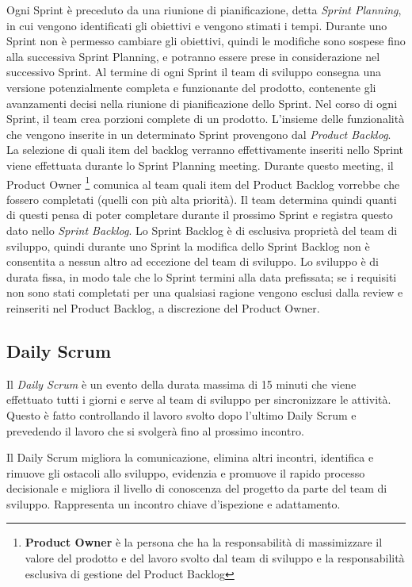 \documentclass{article}
\begin{document}
Ogni Sprint è preceduto da una riunione di pianificazione, detta \textit{Sprint Planning}, in cui vengono identificati 
gli obiettivi e vengono stimati i tempi.
Durante uno Sprint non è permesso cambiare gli obiettivi, quindi le modifiche sono sospese fino alla successiva Sprint Planning, 
e potranno essere prese in considerazione nel successivo Sprint.
Al termine di ogni Sprint il team di sviluppo consegna una versione potenzialmente completa e funzionante del prodotto, 
contenente gli avanzamenti decisi nella riunione di pianificazione dello Sprint.
Nel corso di ogni Sprint, il team crea porzioni complete di un prodotto. 
L'insieme delle funzionalità che vengono inserite in un determinato Sprint provengono dal \textit{Product Backlog}. 
La selezione di quali item del backlog verranno effettivamente inseriti nello Sprint viene effettuata durante lo Sprint Planning meeting. 
Durante questo meeting, il Product Owner \footnote{\textbf{Product Owner} è la persona che ha la responsabilità di massimizzare il valore 
del prodotto e del lavoro svolto dal team di sviluppo e la responsabilità esclusiva di gestione del Product Backlog}
comunica al team quali item del Product Backlog vorrebbe che fossero completati (quelli con più alta priorità). 
Il team determina quindi quanti di questi pensa di poter completare durante il prossimo Sprint e registra questo dato nello \textit{Sprint Backlog}.
Lo Sprint Backlog è di esclusiva proprietà del team di sviluppo, quindi durante uno Sprint la modifica dello Sprint Backlog non è consentita 
a nessun altro ad eccezione del team di sviluppo. 
Lo sviluppo è di durata fissa, in modo tale che lo Sprint termini alla data prefissata; se i requisiti non sono stati completati 
per una qualsiasi ragione vengono esclusi dalla review e reinseriti nel Product Backlog, a discrezione del Product Owner.

\subsection{Daily Scrum}

Il \textit{Daily Scrum} è un evento della durata massima di 15 minuti che viene effettuato tutti i giorni e 
serve al team di sviluppo per sincronizzare le attività. Questo è fatto controllando il lavoro svolto dopo 
l'ultimo Daily Scrum e prevedendo il lavoro che si svolgerà fino al prossimo incontro.

Il Daily Scrum migliora la comunicazione, elimina altri incontri, identifica e rimuove gli ostacoli allo
sviluppo, evidenzia e promuove il rapido processo decisionale e migliora il livello di conoscenza del
progetto da parte del team di sviluppo. Rappresenta un incontro chiave d'ispezione e adattamento.
\end{document}
